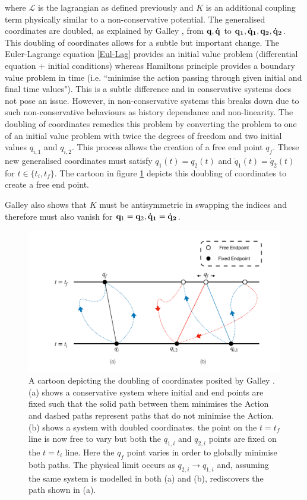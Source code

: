 \documentclass[10pt]{iopart}
\begin{document}
where $\mathcal{L}$ is the lagrangian as defined previously and $K$ is an additional coupling term physically similar to a non-conservative potential. The generalised coordinates are doubled, as explained by Galley \cite{Galley}, from $\bold{q,\dot q}$ to $\bold{q_1,\dot q_1, q_2, \dot q_2}$. This doubling of coordinates allows for a subtle but important change. The Euler-Lagrange equation \ref{Eul-Lag} provides an initial value problem (differential equation + initial conditions) whereas Hamiltons principle provides a boundary value problem in time (i.e. ``minimise the action passing through given initial and final time values"). This is a subtle difference and in conservative systems does not pose an issue. However, in non-conservative systems this breaks down due to such non-conservative behaviours as history dependance and non-linearity. The doubling of coordinates remedies this problem by converting the problem to one of an initial value problem with twice the degrees of freedom and two initial values $q_{i,1}$ and $q_{i,2}$. This process allows the creation of a free end point $q_f$. These new generalised coordinates must satisfy $q_1(t) = q_2(t)$ and $\dot q_1(t) = \dot q_2(t)$ for $t \in \{t_i, t_f\}$. The cartoon in figure \ref{doubledCoords} depicts this doubling of coordinates to create a free end point.

Galley \cite{Galley} also shows that $K$ must be antisymmetric in swapping the indices and therefore must also vanish for $\bold q_1 =\bold q_2,\bold{\dot q_1} =\bold{\dot q_2}$.

\begin{figure}
	\label{doubledCoords}
	\centering
	\includegraphics[width=\columnwidth]{Endpoints.pdf}
	\caption{A cartoon depicting the doubling of coordinates posited by Galley \cite{Galley}. (a) shows a conservative system where initial and end points are fixed such that the solid path between them minimises the Action and dashed paths represent paths that do not minimise the Action. (b) shows a system with doubled coordinates. the point on the $t=t_f$ line is now free to vary but both the $q_{1,i}$ and $q_{2,i}$ points are fixed on the $t=t_i$ line. Here the $q_f$ point varies in order to globally minimise both paths. The physical limit occurs as $q_{2,i}\to q_{1,i}$ and, assuming the same system is modelled in both (a) and (b), rediscovers the path shown in (a).}
\end{figure}
\end{document}
